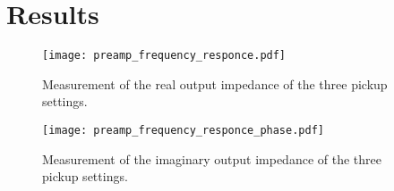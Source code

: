 \section*{Results}

\begin{figure}[htbp!]
	\centering
		\texttt{[image: preamp\_frequency\_responce.pdf]}
		\caption{Measurement of the real output impedance of the three pickup settings.}
		\label{fig:appendix:real_impedance}
		\texttt{[image: preamp\_frequency\_responce\_phase.pdf]}
		\caption{Measurement of the imaginary output impedance of the three pickup settings.}
		\label{fig:appendix:imaginary_impedance}
\end{figure}

